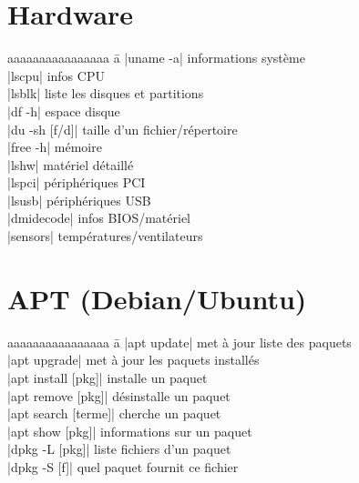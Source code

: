 \documentclass{article}
\begin{document}
\begin{multicols}{4}
    \section*{Hardware}

    \begin{tabbing}
        aaaaaaaaaaaaaaaa \= a \kill
        \code|uname -a| \> informations système \\
        \code|lscpu| \> infos CPU \\
        \code|lsblk| \> liste les disques et partitions \\
        \code|df -h| \> espace disque \\
        \code|du -sh [f/d]| \> taille d'un fichier/répertoire \\
        \code|free -h| \> mémoire \\
        \code|lshw| \> matériel détaillé \\
        \code|lspci| \> périphériques PCI \\
        \code|lsusb| \> périphériques USB \\
        \code|dmidecode| \> infos BIOS/matériel \\
        \code|sensors| \> températures/ventilateurs
    \end{tabbing}

    \section*{APT (Debian/Ubuntu)}
    \begin{tabbing}
        aaaaaaaaaaaaaaaa \= a \kill
        \code|apt update| \> met à jour liste des paquets \\
        \code|apt upgrade| \> met à jour les paquets installés \\
        \code|apt install [pkg]| \> installe un paquet \\
        \code|apt remove [pkg]| \> désinstalle un paquet \\
        \code|apt search [terme]| \> cherche un paquet \\
        \code|apt show [pkg]| \> informations sur un paquet \\
        \code|dpkg -L [pkg]| \> liste fichiers d'un paquet \\
        \code|dpkg -S [f]| \> quel paquet fournit ce fichier
    \end{tabbing}




\end{multicols}
\end{document}

